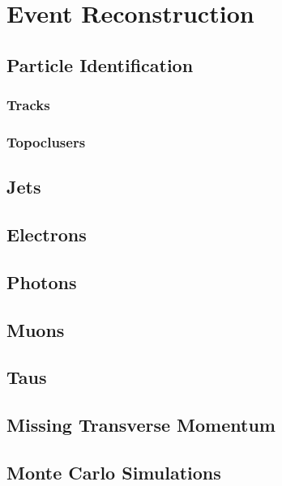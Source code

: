 \chapter{Event Reconstruction}

\section{Particle Identification}
\subsection{Tracks}
\subsection{Topoclusers}

\section{Jets}
\section{Electrons}
\section{Photons}
\section{Muons}
\section{Taus}
\section{Missing Transverse Momentum}
\section{Monte Carlo Simulations}